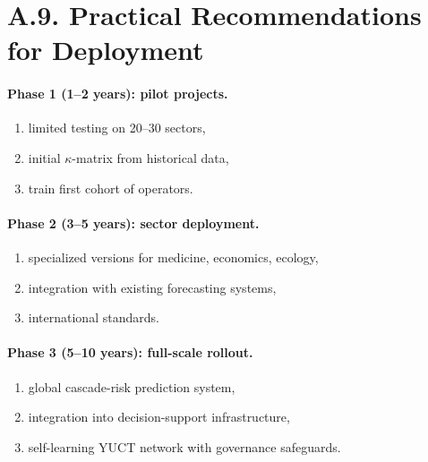 \documentclass[13pt,a4paper]{article}
\begin{document}
	\section*{A.9. Practical Recommendations for Deployment}
	
	\paragraph{Phase 1 (1--2 years): pilot projects.}
	\begin{enumerate}[leftmargin=*]
		\item limited testing on 20--30 sectors,
		\item initial $\kappa$-matrix from historical data,
		\item train first cohort of operators.
	\end{enumerate}
	
	\paragraph{Phase 2 (3--5 years): sector deployment.}
	\begin{enumerate}[leftmargin=*]
		\item specialized versions for medicine, economics, ecology,
		\item integration with existing forecasting systems,
		\item international standards.
	\end{enumerate}
	
	\paragraph{Phase 3 (5--10 years): full-scale rollout.}
	\begin{enumerate}[leftmargin=*]
		\item global cascade-risk prediction system,
		\item integration into decision-support infrastructure,
		\item self-learning YUCT network with governance safeguards.
	\end{enumerate}
	
\end{document}
